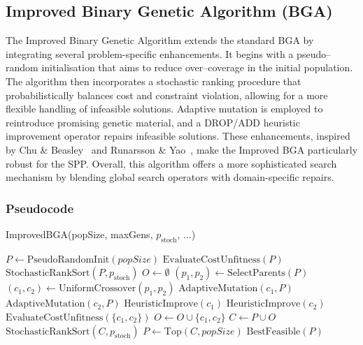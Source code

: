 \documentclass[12pt]{article}
\begin{document}
\newpage

\subsection{Improved Binary Genetic Algorithm (BGA)}
The Improved Binary Genetic Algorithm extends the standard BGA by integrating several problem-specific enhancements. It begins with a pseudo–random initialisation that aims to reduce over–coverage in the initial population. The algorithm then incorporates a stochastic ranking procedure that probabilistically balances cost and constraint violation, allowing for a more flexible handling of infeasible solutions. Adaptive mutation is employed to reintroduce promising genetic material, and a DROP/ADD heuristic improvement operator repairs infeasible solutions. These enhancements, inspired by Chu \& Beasley~\cite{ChuAndBeasley1998} and Runarsson \& Yao~\cite{RunarssonYao2000}, make the Improved BGA particularly robust for the SPP. Overall, this algorithm offers a more sophisticated search mechanism by blending global search operators with domain-specific repairs.

\subsubsection*{Pseudocode}
\begin{algorithm}[htbp]
\caption{ImprovedBGA(popSize, maxGens, \(p_{\mathrm{stoch}}\), ...)}
\begin{algorithmic}[1]
  \State \(P \gets \text{PseudoRandomInit}(popSize)\)
  \State \(\text{EvaluateCostUnfitness}(P)\)
    \State \(\text{StochasticRankSort}(P, p_{\mathrm{stoch}})\)
    \State \(O \gets \emptyset\)
      \State \((p_1, p_2) \gets \text{SelectParents}(P)\)
      \State \((c_1, c_2) \gets \text{UniformCrossover}(p_1, p_2)\)
      \State \(\text{AdaptiveMutation}(c_1, P)\)
      \State \(\text{AdaptiveMutation}(c_2, P)\)
      \State \(\text{HeuristicImprove}(c_1)\)
      \State \(\text{HeuristicImprove}(c_2)\)
      \State \(\text{EvaluateCostUnfitness}(\{c_1, c_2\})\)
      \State \(O \gets O \cup \{c_1, c_2\}\)
    \EndWhile
    \State \(C \gets P \cup O\)
    \State \(\text{StochasticRankSort}(C, p_{\mathrm{stoch}})\)
    \State \(P \gets \text{Top}(C, popSize)\)
  \EndFor
  \State \Return \(\text{BestFeasible}(P)\)
\end{algorithmic}
\end{algorithm}

\newpage
\end{document}
